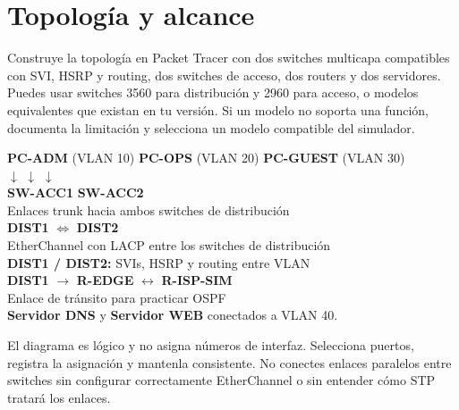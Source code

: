 \documentclass[12pt,a4paper]{article}
\begin{document}
\section{Topología y alcance}

Construye la topología en Packet Tracer con dos switches multicapa compatibles con SVI, HSRP y routing, dos switches de acceso, dos routers y dos servidores. Puedes usar switches 3560 para distribución y 2960 para acceso, o modelos equivalentes que existan en tu versión. Si un modelo no soporta una función, documenta la limitación y selecciona un modelo compatible del simulador.

\begin{center}
\begin{tcolorbox}[width=0.94\textwidth,colback=grisfondo,colframe=black!30]
\centering
\textbf{PC-ADM} (VLAN 10) \quad \textbf{PC-OPS} (VLAN 20) \quad \textbf{PC-GUEST} (VLAN 30)\\[0.25cm]
\(\downarrow\) \hspace{2.4cm} \(\downarrow\) \hspace{2.4cm} \(\downarrow\)\\[0.2cm]
\textbf{SW-ACC1} \hspace{3.0cm} \textbf{SW-ACC2}\\[0.25cm]
{\small Enlaces trunk hacia ambos switches de distribución}\\[0.2cm]
\textbf{DIST1} \(\Longleftrightarrow\) \textbf{DIST2}\\
\small EtherChannel con LACP entre los switches de distribución\\[0.25cm]
\textbf{DIST1 / DIST2:} SVIs, HSRP y routing entre VLAN\\[0.25cm]
\textbf{DIST1} \(\longrightarrow\) \textbf{R-EDGE} \(\longleftrightarrow\) \textbf{R-ISP-SIM}\\
\small Enlace de tránsito para practicar OSPF\\[0.25cm]
\textbf{Servidor DNS} y \textbf{Servidor WEB} conectados a VLAN 40.
\end{tcolorbox}
\end{center}

El diagrama es lógico y no asigna números de interfaz. Selecciona puertos, registra la asignación y mantenla consistente. No conectes enlaces paralelos entre switches sin configurar correctamente EtherChannel o sin entender cómo STP tratará los enlaces.
\end{document}

